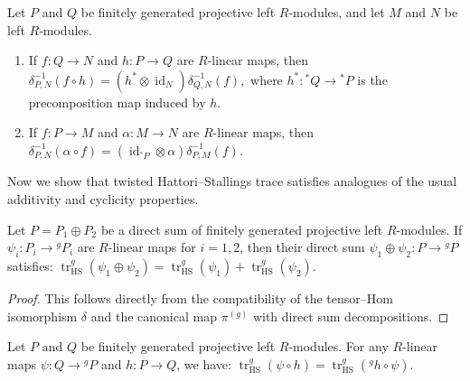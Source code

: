 \documentclass[11pt,oneside]{amsart}
\DeclareMathOperator{\id}{id}
\numberwithin{equation}{section}
\numberwithin{figure}{section}
\theoremstyle{plain}
\theoremstyle{definition}
\theoremstyle{remark}
\begin{document}
\begin{lemma}\label{lem:delta-naturality}
Let $P$ and $Q$ be finitely generated projective left $R$-modules, and let $M$ and $N$ be left $R$-modules.
\begin{enumerate}
\item If $f \colon Q \to N$ and $h \colon P \to Q$ are $R$-linear maps, then
\(
\delta_{P,N}^{-1}(f \circ h) = (h^* \otimes \id_N)\delta_{Q,N}^{-1}(f),
\)
where $h^* \colon {}^*Q \to {}^*P$ is the precomposition map induced by $h$.
\item If $f \colon P \to M$ and $\alpha \colon M \to N$ are $R$-linear maps, then
\(
\delta_{P,N}^{-1}(\alpha \circ f) = (\id_{{}^*P} \otimes \alpha)\delta_{P,M}^{-1}(f).
\)
\end{enumerate}
\end{lemma}





Now we show that twisted Hattori--Stallings trace satisfies analogues of the usual additivity and cyclicity properties.


\begin{prop}\label{prop:twisted-additivity}
Let $P=P_1\oplus P_2$ be a direct sum of finitely generated projective left $R$-modules. If $\psi_i: P_i \to {}^gP_i$ are $R$-linear maps for $i=1,2$, then their direct sum $\psi_1 \oplus \psi_2: P \to {}^gP$ satisfies:
\(
\operatorname{tr}_{\mathrm{HS}}^{g}(\psi_1\oplus \psi_2) = \operatorname{tr}_{\mathrm{HS}}^{g}(\psi_1) + \operatorname{tr}_{\mathrm{HS}}^{g}(\psi_2).
\)
\end{prop}

\begin{proof}
This follows directly from the compatibility of the tensor--Hom isomorphism $\delta$ and the canonical map $\pi^{(g)}$ with direct sum decompositions.
\end{proof}





\begin{prop}\label{prop:algebraic-sliding}
Let $P$ and $Q$ be finitely generated projective left $R$-modules. For any $R$-linear maps $\psi: Q \to {}^gP$ and $h: P \to Q$, we have:
\(
\operatorname{tr}_{\mathrm{HS}}^g(\psi \circ h) = \operatorname{tr}_{\mathrm{HS}}^g({}^g h \circ \psi).
\)
\end{prop}
\end{document}
